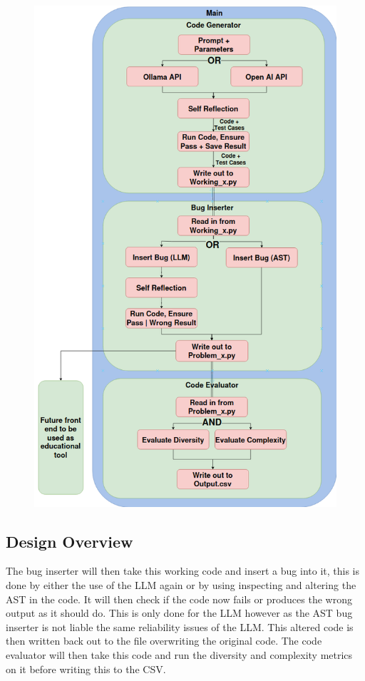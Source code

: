\documentclass[12pt]{extarticle}
\begin{document}
\begin{figure}[htbp]
\centering
\includegraphics[width=\linewidth]{Images/Tall_Design.png}
\label{fig:tall_design}
\end{figure}

\subsection{Design Overview}

The bug inserter will then take this working code and insert a bug into it, this is done by either the use of the LLM again or by using inspecting and altering the AST in the code. It will then check if the code now fails or produces the wrong output as it should do. This is only done for the LLM however as the AST bug inserter is not liable the same reliability issues of the LLM. This altered code is then written back out to the file overwriting the original code. The code evaluator will then take this code and run the diversity and complexity metrics on it before writing this to the CSV.
\end{document}
